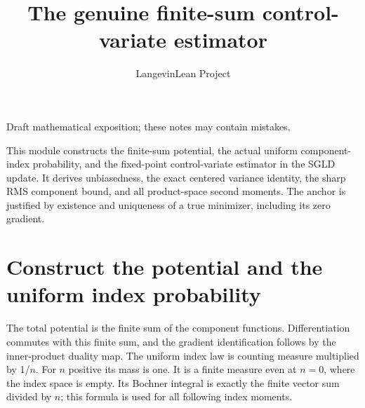 \documentclass[11pt,a4paper]{article}
\title{\texorpdfstring{The genuine finite-sum control-variate estimator}{The genuine finite-sum control-variate estimator}}
\author{LangevinLean Project}
\date{}
\begin{document}
\maketitle
Draft mathematical exposition; these notes may contain mistakes.


This module constructs the finite-sum potential, the actual uniform component-index probability, and the fixed-point control-variate estimator in the SGLD update. It derives unbiasedness, the exact centered variance identity, the sharp RMS component bound, and all product-space second moments. The anchor is justified by existence and uniqueness of a true minimizer, including its zero gradient.


\section{\texorpdfstring{Construct the potential and the uniform index probability}{Construct the potential and the uniform index probability}}


The total potential is the finite sum of the component functions. Differentiation commutes with this finite sum, and the gradient identification follows by the inner-product duality map. The uniform index law is counting measure multiplied by 1/\allowbreak{}\(n\). For \(n\) positive its mass is one. It is a finite measure even at \(n=0\), where the index space is empty. Its Bochner integral is exactly the finite vector sum divided by \(n\); this formula is used for all following index moments.
\end{document}
